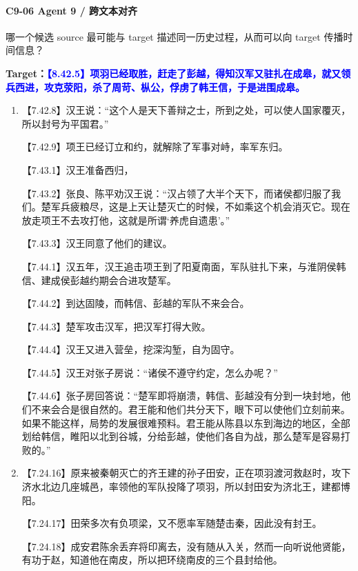 \documentclass[fontset=none,11pt,a4paper]{ctexart}
\begin{document}
\paragraph{C9-06 \quad Agent 9 / 跨文本对齐}
哪一个候选 source 最可能与 target 描述同一历史过程，从而可以向 target 传播时间信息？

\textbf{Target：}\textcolor{blue}{\textbf{【8.42.5】项羽已经取胜，赶走了彭越，得知汉军又驻扎在成皋，就又领兵西进，攻克荥阳，杀了周苛、枞公，俘虏了韩王信，于是进围成皋。}}

\begin{enumerate}[label=\Alph*.]
  \item
\noindent 【7.42.8】汉王说：“这个人是天下善辩之士，所到之处，可以使人国家覆灭，所以封号为平国君。”\par
\noindent 【7.42.9】项王已经订立和约，就解除了军事对峙，率军东归。\par
\noindent 【7.43.1】汉王准备西归，\par
\noindent 【7.43.2】张良、陈平劝汉王说：“汉占领了大半个天下，而诸侯都归服了我们。楚军兵疲粮尽，这是上天让楚灭亡的时候，不如乘这个机会消灭它。现在放走项王不去攻打他，这就是所谓‘养虎自遗患’。”\par
\noindent 【7.43.3】汉王同意了他们的建议。\par
\noindent 【7.44.1】汉五年，汉王追击项王到了阳夏南面，军队驻扎下来，与淮阴侯韩信、建成侯彭越约期会合进攻楚军。\par
\noindent 【7.44.2】到达固陵，而韩信、彭越的军队不来会合。\par
\noindent 【7.44.3】楚军攻击汉军，把汉军打得大败。\par
\noindent 【7.44.4】汉王又进入营垒，挖深沟堑，自为固守。\par
\noindent 【7.44.5】汉王对张子房说：“诸侯不遵守约定，怎么办呢？”\par
\noindent 【7.44.6】张子房回答说：“楚军即将崩溃，韩信、彭越没有分到一块封地，他们不来会合是很自然的。君王能和他们共分天下，眼下可以使他们立刻前来。如果不能这样，局势的发展很难预料。君王能从陈县以东到海边的地区，全部划给韩信，睢阳以北到谷城，分给彭越，使他们各自为战，那么楚军是容易打败的。”\par
  \item
\noindent 【7.24.16】原来被秦朝灭亡的齐王建的孙子田安，正在项羽渡河救赵时，攻下济水北边几座城邑，率领他的军队投降了项羽，所以封田安为济北王，建都博阳。\par
\noindent 【7.24.17】田荣多次有负项梁，又不愿率军随楚击秦，因此没有封王。\par
\noindent 【7.24.18】成安君陈余丢弃将印离去，没有随从入关，然而一向听说他贤能，有功于赵，知道他在南皮，所以把环绕南皮的三个县封给他。\par

\end{enumerate}
\end{document}
